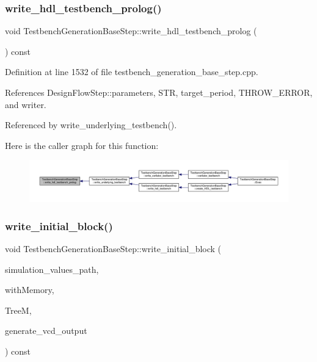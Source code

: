 \subsubsection{\texorpdfstring{write\+\_\+hdl\+\_\+testbench\+\_\+prolog()}{write\_hdl\_testbench\_prolog()}}
{\footnotesize\ttfamily void Testbench\+Generation\+Base\+Step\+::write\+\_\+hdl\+\_\+testbench\+\_\+prolog (\begin{DoxyParamCaption}{ }\end{DoxyParamCaption}) const\hspace{0.3cm}{\ttfamily [protected]}}



Definition at line 1532 of file testbench\+\_\+generation\+\_\+base\+\_\+step.\+cpp.



References Design\+Flow\+Step\+::parameters, S\+TR, target\+\_\+period, T\+H\+R\+O\+W\+\_\+\+E\+R\+R\+OR, and writer.



Referenced by write\+\_\+underlying\+\_\+testbench().

Here is the caller graph for this function\+:
\nopagebreak
\begin{figure}[H]
\begin{center}
\leavevmode
\includegraphics[width=350pt]{dc/d02/classTestbenchGenerationBaseStep_a06ab878cf08dd36fd8273fe4ffcca9d5_icgraph}
\end{center}
\end{figure}
\mbox{\label{classTestbenchGenerationBaseStep_a8bfbb6d0854685400127ee0ed68908cd}} 
\subsubsection{\texorpdfstring{write\+\_\+initial\+\_\+block()}{write\_initial\_block()}}
{\footnotesize\ttfamily void Testbench\+Generation\+Base\+Step\+::write\+\_\+initial\+\_\+block (\begin{DoxyParamCaption}\item[{const std\+::string \&}]{simulation\+\_\+values\+\_\+path,  }\item[{bool}]{with\+Memory,  }\item[{const \hyperlink{tree__manager_8hpp_a792e3f1f892d7d997a8d8a4a12e39346}{tree\+\_\+manager\+Const\+Ref}}]{TreeM,  }\item[{bool}]{generate\+\_\+vcd\+\_\+output }\end{DoxyParamCaption}) const\hspace{0.3cm}{\ttfamily [protected]}}

